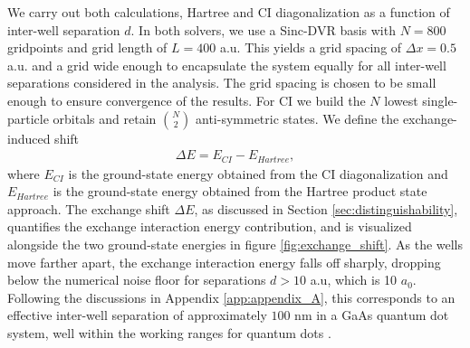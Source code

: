 \documentclass{subfiles}
\begin{document}
We carry out both calculations, Hartree and CI diagonalization as a function of inter-well separation $d$. In both solvers, we use a Sinc-DVR basis with $N=800$ gridpoints and  grid length of $L=400$ a.u. This yields a grid spacing of $\Delta x = 0.5$ a.u. and a grid wide enough to encapsulate the system equally for all inter-well separations considered in the analysis. The grid spacing is chosen to be small enough to ensure convergence of the results. For CI we build the $N$ lowest single-particle orbitals and retain $\binom{N}{2}$ anti-symmetric states. We define the exchange-induced shift
\begin{align*}
    \Delta E = E_{CI} - E_{Hartree},
\end{align*}
where $E_{CI}$ is the ground-state energy obtained from the CI diagonalization and $E_{Hartree}$ is the ground-state energy obtained from the Hartree product state approach. The exchange shift $\Delta E$, as discussed in Section \ref{sec:distinguishability}, quantifies the exchange interaction energy contribution, and is visualized alongside the two ground-state energies in figure \ref{fig:exchange_shift}. As the wells move farther apart, the exchange interaction energy falls off sharply, dropping below the numerical noise floor for separations $d > 10$ a.u, which is 10 $a_0$. Following the discussions in Appendix \ref{app:appendix_A}, this corresponds to an effective inter-well separation of approximately $100$ nm in a GaAs quantum dot system, well within the working ranges for quantum dots \cite{jacak2013quantum, garcia2021semiconductor}.
\end{document}
